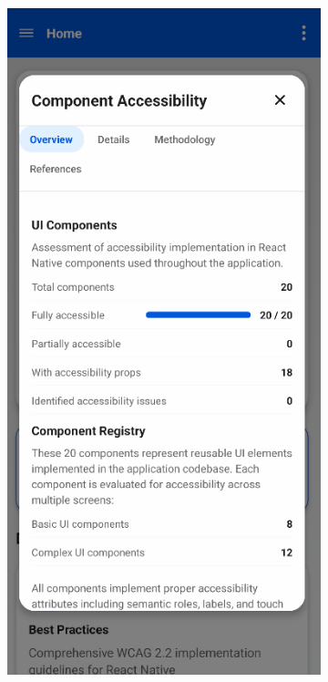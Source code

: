 \begin{figure}[ht]
    \centering
    \begin{subfigure}[b]{0.48\textwidth}
        \centering
        \includegraphics[width=\linewidth]{img/component-modal.png}

\end{subfigure}
\end{figure}
